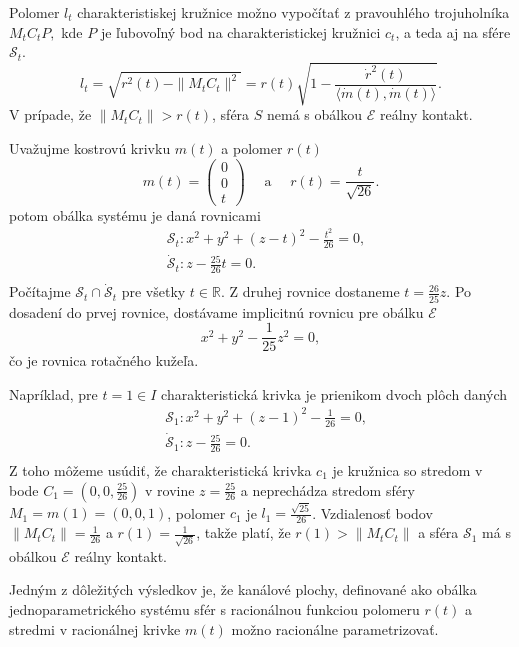 Polomer $l_t$ charakteristiskej kružnice  možno vypočítať z pravouhlého trojuholníka $M_tC_tP,$ kde $P$ je ľubovoľný bod na charakteristickej kružnici $c_t$, a teda aj na sfére $\mathcal{S}_t.$
$$ l_t = \sqrt{r^2(t) - \|M_tC_t\|^2} = r(t) \sqrt{ 1 - \frac{\dot{r}^2(t)}{\langle \dot{m}(t), \dot{m}(t) \rangle}}. $$
V prípade, že $ \|M_tC_t\| > r(t)$, sféra $S$ nemá s obálkou $\mathcal{E}$ reálny kontakt. 

\begin{example}
Uvažujme kostrovú krivku $m(t)$ a polomer $r(t)$
$$ 
m(t) = \begin{pmatrix} 0 \\ 0 \\ t \end{pmatrix} \quad \text{ a } \quad r(t) = \frac{t}{\sqrt{26}}.
$$
potom obálka systému je daná rovnicami
\begin{align*}
&\mathcal{S}_t \colon x^2 + y^2 + (z - t)^2 - \frac{t^2}{26} = 0, \\
&\mathcal{\dot{S}}_t \colon z - \frac{25}{26}t = 0. \\
\end{align*}
Počítajme $ \mathcal{S}_t \cap \mathcal{\dot{S}}_t $ pre všetky $t \in \mathbb{R}.$ Z druhej rovnice dostaneme $t = \frac{26}{25}z$. Po dosadení do prvej rovnice, dostávame implicitnú rovnicu pre obálku $\mathcal{E}$
$$
x^2 + y^2 - \frac{1}{25}z^2 = 0,
$$
čo je rovnica rotačného kužeľa.

Napríklad, pre $t = 1 \in I$ charakteristická krivka je prienikom dvoch plôch daných
\begin{align*}
&\mathcal{S}_1 \colon x^2 + y^2 + (z - 1)^2 - \frac{1}{26} = 0, \\
&\mathcal{\dot{S}}_1 \colon z - \frac{25}{26} = 0. \\
\end{align*}
Z toho môžeme usúdiť, že charakteristická krivka $c_1$ je kružnica so stredom v bode $C_1 = (0, 0, \frac{25}{26})$ v rovine $z = \frac{25}{26}$ a neprechádza stredom sféry $M_1 = m(1) = (0,0,1)$, polomer $c_1$ je $l_{1} = \frac{\sqrt{25}}{26}$. Vzdialenosť bodov $ \|M_tC_t\| = \frac{1}{26}$ a $r(1)= \frac{1}{\sqrt{26}}$, takže platí, že $r(1) > \|M_tC_t\|$ a sféra $\mathcal{S}_1$ má s obálkou $\mathcal{E}$ reálny kontakt.
\end{example}

Jedným z dôležitých výsledkov je, že kanálové plochy, definované ako obálka jednoparametrického systému sfér s racionálnou funkciou polomeru $r(t)$ a stredmi v racionálnej krivke $m(t)$ možno racionálne parametrizovať. \cite{Pet97}


